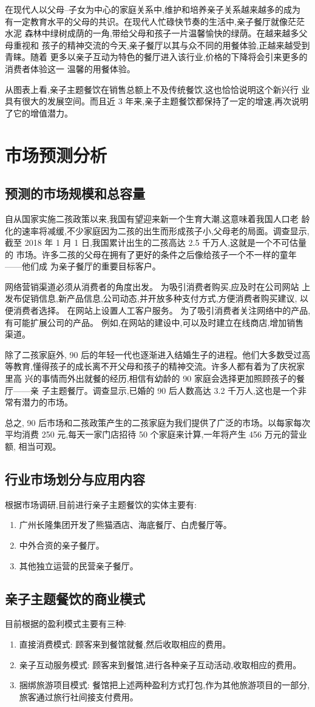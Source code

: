 在现代人以父母--子女为中心的家庭关系中,维护和培养亲子关系越来越多的成为
有一定教育水平的父母的共识。在现代人忙碌快节奏的生活中,亲子餐厅就像茫茫水泥
森林中绿树成荫的一角,带给父母和孩子一片温馨愉快的绿荫。在越来越多父母重视和
孩子的精神交流的今天,亲子餐厅以其与众不同的用餐体验,正越来越受到青睐。随着
更多以亲子互动为特色的餐厅进入该行业,价格的下降将会引来更多的消费者体验这一
温馨的用餐体验。

从图表上看,亲子主题餐饮在销售总额上不及传统餐饮,这也恰恰说明这个新兴行
业具有很大的发展空间。而且近 3 年来,亲子主题餐饮都保持了一定的增速,再次说明
了它的增值潜力。

\section{市场预测分析}

\subsection{预测的市场规模和总容量}
自从国家实施二孩政策以来,我国有望迎来新一个生育大潮,这意味着我国人口老
龄化的速率将减缓,不少家庭因为二孩的出生而形成孩子小,父母老的局面。调查显示,
截至 2018 年 1 月 1 日,我国累计出生的二孩高达 2.5 千万人,这就是一个不可估量的
市场。许多二孩的父母在拥有了更好的条件之后像给孩子一个不一样的童年——他们成
为亲子餐厅的重要目标客户。

网络营销渠道必须从消费者的角度出发。 为吸引消费者购买,应及时在公司网站
上发布促销信息,新产品信息,公司动态,并开放多种支付方式,方便消费者购买建议,
以便消费者选择。 在网站上设置人工客户服务。 为了吸引消费者关注网络中的产品,
有可能扩展公司的产品。 例如,在网站的建设中,可以及时建立在线商店,增加销售
渠道。

除了二孩家庭外, 90 后的年轻一代也逐渐进入结婚生子的进程。他们大多数受过高
等教育,懂得孩子的成长离不开父母和孩子的精神交流。许多人都有着为了庆祝家里高
兴的事情而外出就餐的经历,相信有幼龄的 90 家庭会选择更加照顾孩子的餐厅——亲
子主题餐厅。调查显示,已婚的 90 后人数高达 3.2 千万人,这也是一个非常有潜力的市场。

总之, 90 后市场和二孩政策产生的二孩家庭为我们提供了广泛的市场。以每家每次
平均消费 250 元,每天一家门店招待 50 个家庭来计算,一年将产生 456 万元的营业额,
相当可观。

\subsection{行业市场划分与应用内容}
根据市场调研,目前进行亲子主题餐饮的实体主要有:
\begin{enumerate}[1)]
\item
广州长隆集团开发了熊猫酒店、海底餐厅、白虎餐厅等。
\item
中外合资的亲子餐厅。
\item
其他独立运营的民营亲子餐厅。
\end{enumerate}

\subsection{亲子主题餐饮的商业模式}
目前根据的盈利模式主要有三种:
\begin{enumerate}[1)]
\item
直接消费模式: 顾客来到餐馆就餐,然后收取相应的费用。
\item
亲子互动服务模式: 顾客来到餐馆,进行各种亲子互动活动,收取相应的费用。
\item
捆绑旅游项目模式: 餐馆把上述两种盈利方式打包,作为其他旅游项目的一部分,
旅客通过旅行社间接支付费用。
\end{enumerate}
